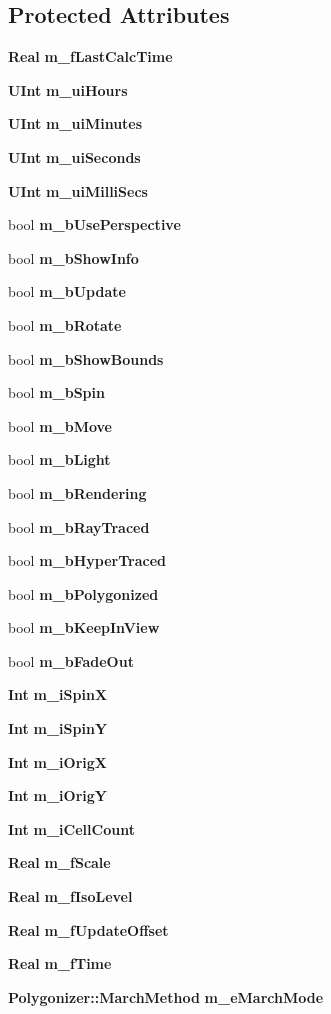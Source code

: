 \subsection*{Protected Attributes}
\begin{CompactItemize}
\item 
{\bf Real} {\bf m\_\-f\-Last\-Calc\-Time}
\item 
{\bf UInt} {\bf m\_\-ui\-Hours}
\item 
{\bf UInt} {\bf m\_\-ui\-Minutes}
\item 
{\bf UInt} {\bf m\_\-ui\-Seconds}
\item 
{\bf UInt} {\bf m\_\-ui\-Milli\-Secs}
\item 
bool {\bf m\_\-b\-Use\-Perspective}
\item 
bool {\bf m\_\-b\-Show\-Info}
\item 
bool {\bf m\_\-b\-Update}
\item 
bool {\bf m\_\-b\-Rotate}
\item 
bool {\bf m\_\-b\-Show\-Bounds}
\item 
bool {\bf m\_\-b\-Spin}
\item 
bool {\bf m\_\-b\-Move}
\item 
bool {\bf m\_\-b\-Light}
\item 
bool {\bf m\_\-b\-Rendering}
\item 
bool {\bf m\_\-b\-Ray\-Traced}
\item 
bool {\bf m\_\-b\-Hyper\-Traced}
\item 
bool {\bf m\_\-b\-Polygonized}
\item 
bool {\bf m\_\-b\-Keep\-In\-View}
\item 
bool {\bf m\_\-b\-Fade\-Out}
\item 
{\bf Int} {\bf m\_\-i\-Spin\-X}
\item 
{\bf Int} {\bf m\_\-i\-Spin\-Y}
\item 
{\bf Int} {\bf m\_\-i\-Orig\-X}
\item 
{\bf Int} {\bf m\_\-i\-Orig\-Y}
\item 
{\bf Int} {\bf m\_\-i\-Cell\-Count}
\item 
{\bf Real} {\bf m\_\-f\-Scale}
\item 
{\bf Real} {\bf m\_\-f\-Iso\-Level}
\item 
{\bf Real} {\bf m\_\-f\-Update\-Offset}
\item 
{\bf Real} {\bf m\_\-f\-Time}
\item 
{\bf Polygonizer::March\-Method} {\bf m\_\-e\-March\-Mode}
\item 

\end{CompactItemize}
